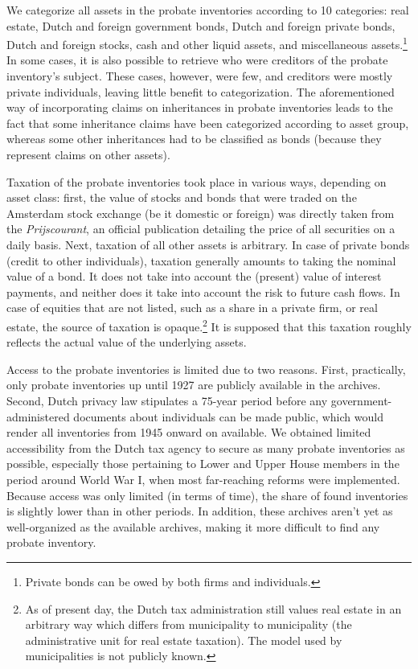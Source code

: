     We categorize all assets in the probate inventories according to 10 categories: real estate, Dutch and foreign government bonds, Dutch and foreign private bonds, Dutch and foreign stocks, cash and other liquid assets, and miscellaneous assets.\footnote{Private bonds can be owed by  both firms and individuals.} In some cases, it is also possible to retrieve who were creditors of the probate inventory's subject. These cases, however, were few, and creditors were mostly private individuals, leaving little benefit to categorization. The aforementioned way of incorporating claims on inheritances in probate inventories leads to the fact that some inheritance claims have been categorized according to asset group, whereas some other inheritances had to be classified as bonds (because they represent claims on other assets). 

    Taxation of the probate inventories took place in various ways, depending on asset class: first, the value of stocks and bonds that were traded on the Amsterdam stock exchange (be it domestic or foreign) was directly taken from the \textit{Prijscourant}, an official publication detailing the price of all securities on a daily basis. Next, taxation of all other assets is arbitrary. In case of private bonds (credit to other individuals), taxation generally amounts to taking the nominal value of a bond. It does not take into account the (present) value of interest payments, and neither does it take into account the risk to future cash flows. In case of equities that are not listed, such as a share in a private firm, or real estate, the source of taxation is opaque.\footnote{As of present day, the Dutch tax administration still values real estate in an arbitrary way which differs from municipality to municipality (the administrative unit for real estate taxation). The model used by municipalities is not publicly known.} It is supposed that this taxation roughly reflects the actual value of the underlying assets. 

    Access to the probate inventories is limited due to two reasons. First, practically, only probate inventories up until 1927 are publicly available in the archives. Second, Dutch privacy law stipulates a 75-year period before any government-administered documents about individuals can be made public, which would render all inventories from 1945 onward on available. We obtained limited accessibility from the Dutch tax agency to secure as many probate inventories as possible, especially those pertaining to Lower and Upper House members in the period around World War I, when most far-reaching reforms were implemented. Because access was only limited (in terms of time), the share of found inventories is slightly lower than in other periods. In addition, these archives aren't yet as well-organized as the available archives, making it more difficult to find any probate inventory. 

